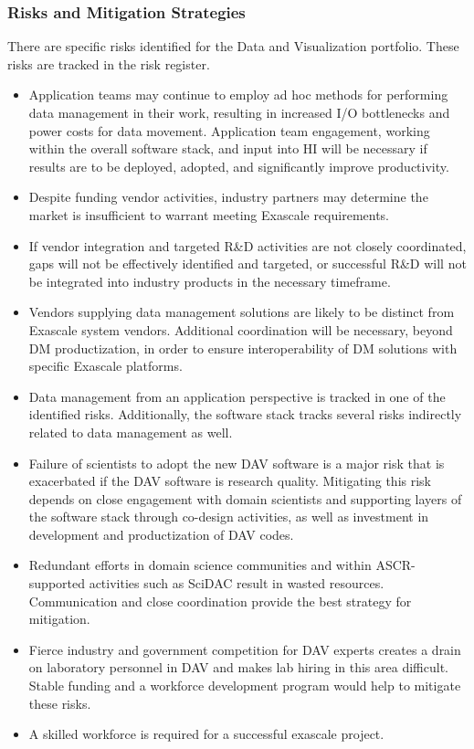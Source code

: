 \subsubsection{Risks and Mitigation Strategies}
There are specific risks identified for the Data and Visualization portfolio.  These risks are tracked in the risk register.  
\begin{itemize}
\item Application teams may continue to employ ad hoc methods for performing data management in their work, resulting in increased I/O bottlenecks and power costs for data movement. Application team engagement, working within the overall software stack, and input into HI will be necessary if results are to be deployed, adopted, and significantly improve productivity.
\item Despite funding vendor activities, industry partners may determine the market is insufficient to warrant meeting Exascale requirements.
\item If vendor integration and targeted R\&D activities are not closely coordinated, gaps will not be effectively identified and targeted, or successful R\&D will not be integrated into industry products in the necessary timeframe.
\item Vendors supplying data management solutions are likely to be distinct from Exascale system vendors. Additional coordination will be necessary, beyond DM productization, in order to ensure interoperability of DM solutions with specific Exascale platforms.
\item Data management from an application perspective is tracked in one of the identified risks.  Additionally, the software stack tracks several risks indirectly related to data management as well.
\item Failure of scientists to adopt the new DAV software is a major risk that is exacerbated if the DAV software is research quality. Mitigating this risk depends on close engagement with domain scientists and supporting layers of the software stack through co-design activities, as well as investment in development and productization of DAV codes.
\item Redundant efforts in domain science communities and within ASCR-supported activities such as SciDAC result in wasted resources. Communication and close coordination provide the best strategy for mitigation.
\item Fierce industry and government competition for DAV experts creates a drain on laboratory personnel in DAV and makes lab hiring in this area difficult. Stable funding and a workforce development program would help to mitigate these risks.
\item A skilled workforce is required for a successful exascale project.
\end{itemize}

